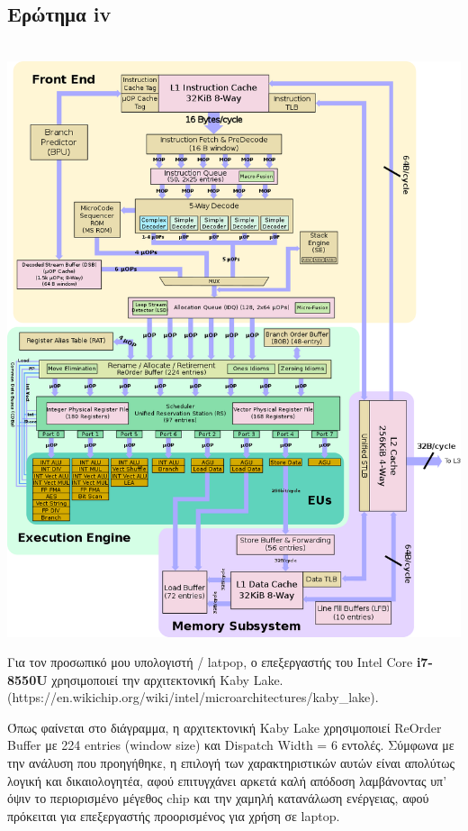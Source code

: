 \subsection{Ερώτημα iv}
   \begin{minipage}{\textwidth}
      \begin{center}
         \\
         \vspace{3mm}
         \includegraphics[width=\textwidth]{./imgs/kaby.png}
         \vspace{6mm}
      \end{center}
   \end{minipage}

   Για τον προσωπικό μου υπολογιστή / latpop, ο επεξεργαστής του Intel Core 
   \textbf{i7-8550U}
   χρησιμοποιεί την αρχιτεκτονική Kaby Lake.
   (https://en.wikichip.org/wiki/intel/microarchitectures/kaby\_lake).

   Όπως φαίνεται στο διάγραμμα, η αρχιτεκτονική Kaby Lake χρησιμοποιεί ReOrder
   Buffer με 224 entries (window size) και Dispatch Width = 6 εντολές. Σύμφωνα
   με την ανάλυση που προηγήθηκε, η επιλογή των χαρακτηριστικών αυτών είναι
   απολύτως λογική και δικαιολογητέα, αφού επιτυγχάνει αρκετά καλή απόδοση
   λαμβάνοντας υπ' όψιν το περιορισμένο μέγεθος chip και την χαμηλή κατανάλωση
   ενέργειας, αφού πρόκειται για επεξεργαστής προορισμένος για χρήση σε laptop. 
